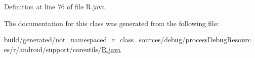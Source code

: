 Definition at line 76 of file R.\+java.



The documentation for this class was generated from the following file\+:\begin{DoxyCompactItemize}
\item 
build/generated/not\+\_\+namespaced\+\_\+r\+\_\+class\+\_\+sources/debug/process\+Debug\+Resources/r/android/support/coreutils/\mbox{\hyperlink{android_2support_2coreutils_2_r_8java}{R.\+java}}\end{DoxyCompactItemize}
